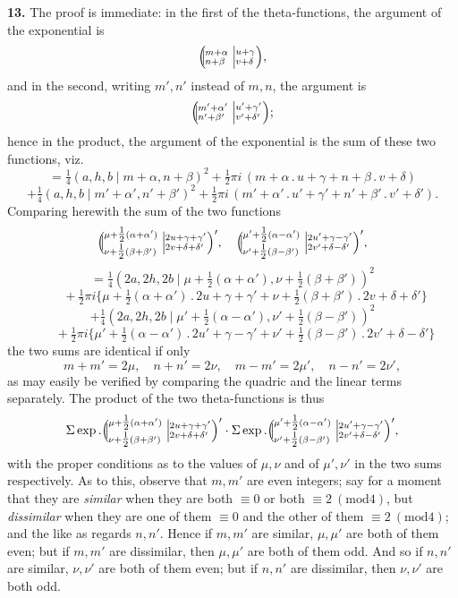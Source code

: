 \documentclass[11pt]{article}
\providecommand{\modd}{\mathrm{mod}}
\begin{document}
\textbf{13.} The proof is immediate: in the first of the theta-functions, the argument of the exponential is
\[
\Bigl(\!\!\bigm|\!\!^{m+\alpha}_{n+\beta}\Bigm|\!\!^{u+\gamma}_{v+\delta}\Bigr),
\]
and in the second, writing $m',n'$ instead of $m,n$, the argument is
\[
\Bigl(\!\!\bigm|\!\!^{m'+\alpha'}_{n'+\beta'}\Bigm|\!\!^{u'+\gamma'}_{v'+\delta'}\Bigr);
\]
hence in the product, the argument of the exponential is the sum of these two functions, viz.
\[
= \tfrac{1}{4}(a,h,b\mid m + \alpha, n + \beta)^2 + \tfrac{1}{2}\pi i\,(m + \alpha\mathbin{.}u + \gamma + n + \beta\mathbin{.}v + \delta)
\]
\[
+ \tfrac{1}{4}(a,h,b\mid m' + \alpha', n' + \beta')^2 + \tfrac{1}{2}\pi i\,(m' + \alpha'\mathbin{.}u' + \gamma' + n' + \beta'\mathbin{.}v' + \delta').
\]
Comparing herewith the sum of the two functions
\[
\Bigl(\!\!\bigm|\!\!^{\mu + \tfrac{1}{2}(\alpha + \alpha')}_{\nu + \tfrac{1}{2}(\beta + \beta')}\Bigm|\!\!^{2u + \gamma + \gamma'}_{2v + \delta + \delta'}\Bigr)',\quad \Bigl(\!\!\bigm|\!\!^{\mu' + \tfrac{1}{2}(\alpha - \alpha')}_{\nu' + \tfrac{1}{2}(\beta - \beta')}\Bigm|\!\!^{2u' + \gamma - \gamma'}_{2v' + \delta - \delta'}\Bigr)',
\]
\[
= \tfrac{1}{4}(2a, 2h, 2b\mid \mu + \tfrac{1}{2}(\alpha + \alpha'), \nu + \tfrac{1}{2}(\beta + \beta'))^2
\]
\[
\hspace{2em}+ \tfrac{1}{2}\pi i\bigl\{\mu + \tfrac{1}{2}(\alpha + \alpha')\mathbin{.}2u + \gamma + \gamma' + \nu + \tfrac{1}{2}(\beta + \beta')\mathbin{.}2v + \delta + \delta'\bigr\}
\]
\[
+ \tfrac{1}{4}(2a, 2h, 2b\mid \mu' + \tfrac{1}{2}(\alpha - \alpha'), \nu' + \tfrac{1}{2}(\beta - \beta'))^2
\]
\[
\hspace{2em}+ \tfrac{1}{2}\pi i\bigl\{\mu' + \tfrac{1}{2}(\alpha - \alpha')\mathbin{.}2u' + \gamma - \gamma' + \nu' + \tfrac{1}{2}(\beta - \beta')\mathbin{.}2v' + \delta - \delta'\bigr\}
\]
the two sums are identical if only
\[
m + m' = 2\mu,\quad n + n' = 2\nu,\quad m - m' = 2\mu',\quad n - n' = 2\nu',
\]
as may easily be verified by comparing the quadric and the linear terms separately. The product of the two theta-functions is thus
\[
\Sigma\exp.\Bigl(\!\!\bigm|\!\!^{\mu + \tfrac{1}{2}(\alpha + \alpha')}_{\nu + \tfrac{1}{2}(\beta + \beta')}\Bigm|\!\!^{2u + \gamma + \gamma'}_{2v + \delta + \delta'}\Bigr)'\cdot \Sigma\exp.\Bigl(\!\!\bigm|\!\!^{\mu' + \tfrac{1}{2}(\alpha - \alpha')}_{\nu' + \tfrac{1}{2}(\beta - \beta')}\Bigm|\!\!^{2u' + \gamma - \gamma'}_{2v' + \delta - \delta'}\Bigr)',
\]
with the proper conditions as to the values of $\mu,\nu$ and of $\mu',\nu'$ in the two sums respectively. As to this, observe that $m,m'$ are even integers; say for a moment that they are \textit{similar} when they are both $\equiv 0$ or both $\equiv 2\ (\modd 4)$, but \textit{dissimilar} when they are one of them $\equiv 0$ and the other of them $\equiv 2\ (\modd 4)$; and the like as regards $n,n'$. Hence if $m,m'$ are similar, $\mu,\mu'$ are both of them even; but if $m,m'$ are dissimilar, then $\mu,\mu'$ are both of them odd. And so if $n,n'$ are similar, $\nu,\nu'$ are both of them even; but if $n,n'$ are dissimilar, then $\nu,\nu'$ are both odd.
\end{document}
